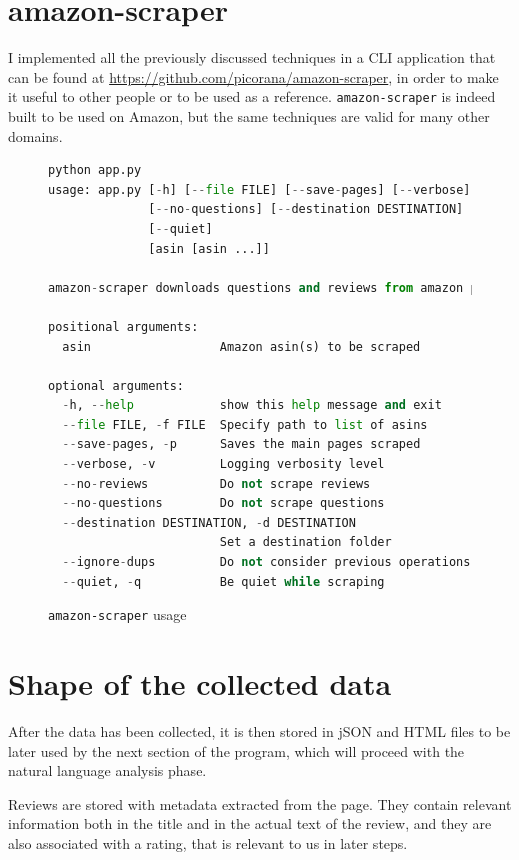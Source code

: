 \documentclass[LaM,binding=0.6cm]{sapthesis}
\begin{document}
\section{amazon-scraper}
I implemented all the previously discussed techniques in a CLI application that can be found at \url{https://github.com/picorana/amazon-scraper}, in order to make it useful to other people or to be used as a reference. \texttt{amazon-scraper} is indeed built to be used on Amazon, but the same techniques are valid for many other domains.

\begin{figure}
\centering
\begin{lstlisting}[language=python]
python app.py
usage: app.py [-h] [--file FILE] [--save-pages] [--verbose] [--no-reviews]
              [--no-questions] [--destination DESTINATION] [--ignore-dups]
              [--quiet]
              [asin [asin ...]]

amazon-scraper downloads questions and reviews from amazon products

positional arguments:
  asin                  Amazon asin(s) to be scraped

optional arguments:
  -h, --help            show this help message and exit
  --file FILE, -f FILE  Specify path to list of asins
  --save-pages, -p      Saves the main pages scraped
  --verbose, -v         Logging verbosity level
  --no-reviews          Do not scrape reviews
  --no-questions        Do not scrape questions
  --destination DESTINATION, -d DESTINATION
                        Set a destination folder
  --ignore-dups         Do not consider previous operations
  --quiet, -q           Be quiet while scraping
\end{lstlisting}
\caption{\texttt{amazon-scraper} usage}
\label{fig:amazon-scraper}
\end{figure}

\section{Shape of the collected data}

After the data has been collected, it is then stored in jSON and HTML files to be later used by the next section of the program, which will proceed with the natural language analysis phase.

Reviews are stored with metadata extracted from the page. They contain relevant information both in the title and in the actual text of the review, and they are also associated with a rating, that is relevant to us in later steps.
\end{document}
